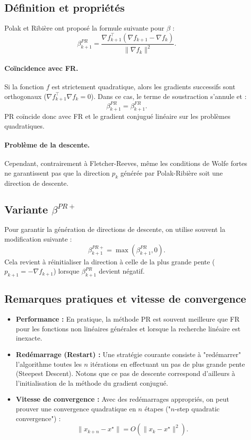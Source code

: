 \subsection{Définition et propriétés}

Polak et Ribière ont proposé la formule suivante pour $\beta$ :
\[
\boxed{\beta_{k+1}^{PR} = \frac{\nabla f_{k+1}^\top (\nabla f_{k+1} - \nabla f_k)}{\|\nabla f_k\|^2}}.
\]

\paragraph{Coïncidence avec FR.}
Si la fonction $f$ est strictement quadratique, alors les gradients successifs sont orthogonaux ($\nabla f_{k+1}^\top \nabla f_k = 0$). Dans ce cas, le terme de soustraction s'annule et :
\[
\beta_{k+1}^{PR} = \beta_{k+1}^{FR}.
\]
PR coïncide donc avec FR et le gradient conjugué linéaire sur les problèmes quadratiques.

\paragraph{Problème de la descente.}
Cependant, contrairement à Fletcher-Reeves, même les conditions de Wolfe fortes ne garantissent pas que la direction $p_k$ générée par Polak-Ribière soit une direction de descente.

\subsection{Variante \texorpdfstring{$\beta^{PR+}$}{beta\_PR+}}

Pour garantir la génération de directions de descente, on utilise souvent la modification suivante :
\[
\beta_{k+1}^{PR+} = \max\left( \beta_{k+1}^{PR}, 0 \right).
\]
Cela revient à réinitialiser la direction à celle de la plus grande pente ($p_{k+1} = -\nabla f_{k+1}$) lorsque $\beta_{k+1}^{PR}$ devient négatif.

\subsection{Remarques pratiques et vitesse de convergence}

\begin{itemize}
    \item \textbf{Performance :} En pratique, la méthode PR est souvent meilleure que FR pour les fonctions non linéaires générales et lorsque la recherche linéaire est inexacte.
    \item \textbf{Redémarrage (Restart) :} Une stratégie courante consiste à "redémarrer" l'algorithme toutes les $n$ itérations en effectuant un pas de plus grande pente (Steepest Descent). Notons que ce pas de descente correspond d'ailleurs à l'initialisation de la méthode du gradient conjugué.
    \item \textbf{Vitesse de convergence :} Avec des redémarrages appropriés, on peut prouver une convergence quadratique en $n$ étapes ("$n$-step quadratic convergence") :
    \[
    \|x_{k+n} - x^\star\| = O\left( \|x_k - x^\star\|^2 \right).
    \]
\end{itemize}

